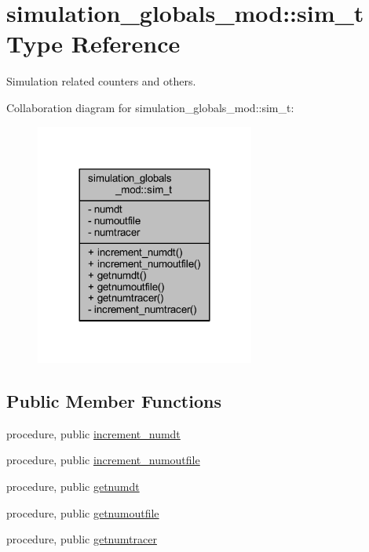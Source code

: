 \hypertarget{structsimulation__globals__mod_1_1sim__t}{}\section{simulation\+\_\+globals\+\_\+mod\+:\+:sim\+\_\+t Type Reference}
\label{structsimulation__globals__mod_1_1sim__t}


Simulation related counters and others.  




Collaboration diagram for simulation\+\_\+globals\+\_\+mod\+:\+:sim\+\_\+t\+:\nopagebreak
\begin{figure}[H]
\begin{center}
\leavevmode
\includegraphics[width=204pt]{structsimulation__globals__mod_1_1sim__t__coll__graph}
\end{center}
\end{figure}
\subsection*{Public Member Functions}
\begin{DoxyCompactItemize}
\item 
procedure, public \mbox{\hyperlink{structsimulation__globals__mod_1_1sim__t_a252c6fe9d5783ddb0ed2b3a78444c18e}{increment\+\_\+numdt}}
\item 
procedure, public \mbox{\hyperlink{structsimulation__globals__mod_1_1sim__t_aa8ef9d1e862c541c700b3bae819d7d12}{increment\+\_\+numoutfile}}
\item 
procedure, public \mbox{\hyperlink{structsimulation__globals__mod_1_1sim__t_a631b55f5da372943464059c0aef77f09}{getnumdt}}
\item 
procedure, public \mbox{\hyperlink{structsimulation__globals__mod_1_1sim__t_a968cc771ddeefe57addd7391a5bc8aaf}{getnumoutfile}}
\item 
procedure, public \mbox{\hyperlink{structsimulation__globals__mod_1_1sim__t_a18168855c804f8215039f3b1388435f8}{getnumtracer}}
\end{DoxyCompactItemize}

